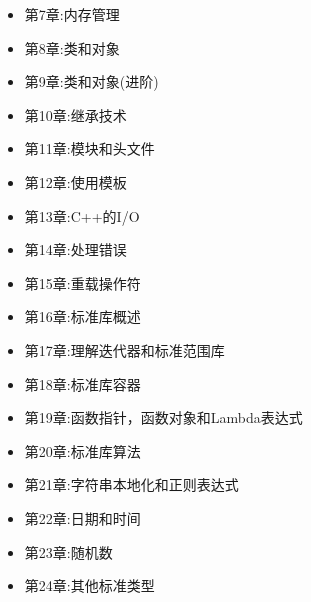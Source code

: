 \begin{itemize}
\item
第7章:内存管理

\item
第8章:类和对象

\item
第9章:类和对象(进阶)

\item
第10章:继承技术

\item
第11章:模块和头文件

\item
第12章:使用模板

\item
第13章:C++的I/O

\item
第14章:处理错误

\item
第15章:重载操作符

\item
第16章:标准库概述

\item
第17章:理解迭代器和标准范围库

\item
第18章:标准库容器

\item
第19章:函数指针，函数对象和Lambda表达式

\item
第20章:标准库算法

\item
第21章:字符串本地化和正则表达式

\item
第22章:日期和时间

\item
第23章:随机数

\item
第24章:其他标准类型
\end{itemize}